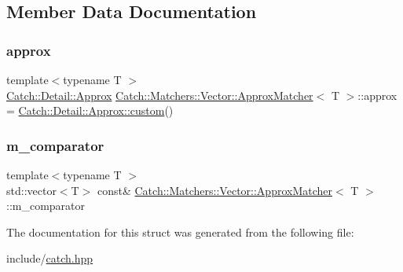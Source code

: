 \subsection{Member Data Documentation}
\mbox{\label{struct_catch_1_1_matchers_1_1_vector_1_1_approx_matcher_a5515447af58adb5dc48a5d300b9ae162}} 
\subsubsection{\texorpdfstring{approx}{approx}}
{\footnotesize\ttfamily template$<$typename T $>$ \\
\mbox{\hyperlink{class_catch_1_1_detail_1_1_approx}{Catch\+::\+Detail\+::\+Approx}} \mbox{\hyperlink{struct_catch_1_1_matchers_1_1_vector_1_1_approx_matcher}{Catch\+::\+Matchers\+::\+Vector\+::\+Approx\+Matcher}}$<$ T $>$\+::approx = \mbox{\hyperlink{class_catch_1_1_detail_1_1_approx_aaf86dc0ee92272ac2d9839197a07951d}{Catch\+::\+Detail\+::\+Approx\+::custom}}()\hspace{0.3cm}{\ttfamily [mutable]}}

\mbox{\label{struct_catch_1_1_matchers_1_1_vector_1_1_approx_matcher_a1394b5913d30bdd1147e1941fc41af56}} 
\subsubsection{\texorpdfstring{m\_comparator}{m\_comparator}}
{\footnotesize\ttfamily template$<$typename T $>$ \\
std\+::vector$<$T$>$ const\& \mbox{\hyperlink{struct_catch_1_1_matchers_1_1_vector_1_1_approx_matcher}{Catch\+::\+Matchers\+::\+Vector\+::\+Approx\+Matcher}}$<$ T $>$\+::m\+\_\+comparator}



The documentation for this struct was generated from the following file\+:\begin{DoxyCompactItemize}
\item 
include/\mbox{\hyperlink{catch_8hpp}{catch.\+hpp}}\end{DoxyCompactItemize}
